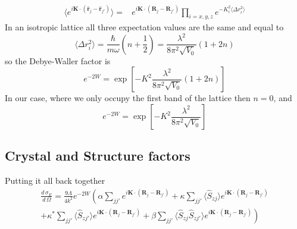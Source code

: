 \documentclass[11pt,letter]{article}
\newcommand{\bv}[1]{\ensuremath{\mathbf{#1}}}
\newcommand{\dsig}[1]{\ensuremath{ \frac{ d\,\sigma_{#1} }{d\,\Omega} }}
\begin{document}
\begin{equation}
\begin{split} 
\langle e^{ i \bv{K} \cdot (  \hat{\bv{r}}_{j} - \hat{\bv{r}}_{j'} )  } \rangle  
 = &  
 e^{i \bv{K} \cdot ( \bv{R}_{j} - \bv{R}_{j'} ) }
 \prod_{i=x,y,z}  e^{ - K_{i}^{2} \langle \Delta r_{i}^{2} \rangle  } 
\end{split}
\end{equation}
In an isotropic lattice all three expectation values are the same and equal to  
\begin{equation}
\langle \Delta r_{i}^{2} \rangle = \frac{\hbar}{m\omega}\left(n+\frac{1}{2}  \right) = \frac{\lambda^{2}}{8 \pi^{2}\sqrt{V_{0}}} ( 1 + 2n) 
\end{equation}
so the Debye-Waller factor is 
\begin{equation}
e^{-2W} = \exp\left[-K^{2} \frac{\lambda^{2}}{8\pi^{2} \sqrt{V_{0}}} ( 1+2n) \right]
\end{equation}
In our case, where we only occupy the first band of the lattice then $n=0$, and  
\begin{equation}
e^{-2W} = \exp\left[-K^{2} \frac{\lambda^{2}}{8\pi^{2} \sqrt{V_{0}}} \right]
\end{equation}

\subsection{Crystal and Structure factors }

Putting it all back together 
\begin{multline}
\dsig{E} =  \frac{9\Lambda}{4k^{2}} e^{-2W} \left(
               \alpha \sum_{ j j' }      e^{i\bv{K}\cdot(\bv{R}_{j}-\bv{R}_{j'})}
            +  \kappa \sum_{ j j' } \langle \hat{S}_{zj} \rangle e^{i\bv{K}\cdot(\bv{R}_{j}-\bv{R}_{j'})} \right. \\
  \left.    +  \kappa^{*} \sum_{ j j' } \langle \hat{S}_{zj'} \rangle e^{i\bv{K}\cdot(\bv{R}_{j}-\bv{R}_{j'})}
            +  \beta \sum_{j j'} \langle \hat{S}_{zj} \hat{S}_{zj'} \rangle e^{i\bv{K}\cdot(\bv{R}_{j}-\bv{R}_{j'})}  \right) 
\end{multline}
\end{document}
